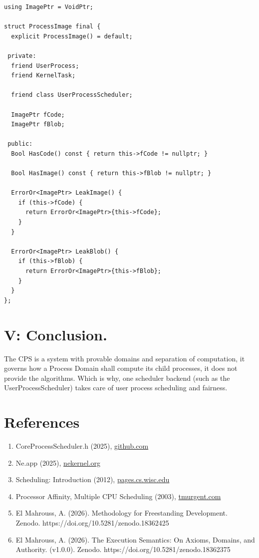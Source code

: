 \documentclass[11pt, a4paper]{article}
\begin{document}
\begin{lstlisting}
using ImagePtr = VoidPtr;

struct ProcessImage final {
  explicit ProcessImage() = default;

 private:
  friend UserProcess;
  friend KernelTask;

  friend class UserProcessScheduler;

  ImagePtr fCode;
  ImagePtr fBlob;

 public:
  Bool HasCode() const { return this->fCode != nullptr; }

  Bool HasImage() const { return this->fBlob != nullptr; }

  ErrorOr<ImagePtr> LeakImage() {
    if (this->fCode) {
      return ErrorOr<ImagePtr>{this->fCode};
    }
  }

  ErrorOr<ImagePtr> LeakBlob() {
    if (this->fBlob) {
      return ErrorOr<ImagePtr>{this->fBlob};
    }
  }
};
\end{lstlisting}

\section{V: Conclusion.}

{The CPS is a system with provable domains and separation of computation, it governs how a Process Domain shall compute its child processes, it does not provide the algorithms.} {Which is why, one scheduler backend (such as the UserProcessScheduler) takes care of user process scheduling and fairness.}

\section{References}

\begin{enumerate}
    \item CoreProcessScheduler.h (2025), \href{https://github.com/ne-foss-org/nekernel/blob/develop/src/kernel/KernelKit/CoreProcessScheduler.h}{github.com}
    
    \item Ne.app (2025), \href{https://nekernel.org/nekernel}{nekernel.org}
    \item Scheduling: Introduction (2012), \href{https://pages.cs.wisc.edu/~remzi/OSTEP/cpu-sched.pdf}{pages.cs.wisc.edu}
    
    \item  Processor Affinity, Multiple CPU Scheduling (2003), \href{https://www.tmurgent.com/WhitePapers/ProcessorAffinity.pdf}{tmurgent.com}
    
    \item El Mahrouss, A. (2026). Methodology for Freestanding Development.\\ Zenodo. https://doi.org/10.5281/zenodo.18362425
    
    \item El Mahrouss, A. (2026). The Execution Semantics: On Axioms, Domains, and Authority. (v1.0.0). Zenodo. https://doi.org/10.5281/zenodo.18362375
\end{enumerate}
\end{document}
